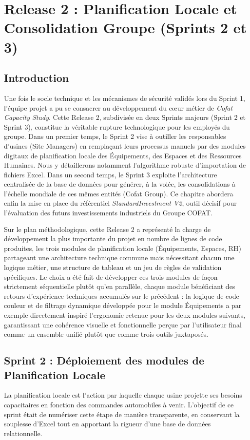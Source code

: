 \chapter{Release 2 : Planification Locale et Consolidation Groupe (Sprints 2 et 3)}
\label{chap:sprints_2_3}

\section{Introduction}
Une fois le socle technique et les mécanismes de sécurité validés lors du Sprint 1, l'équipe projet a pu se consacrer au développement du cœur métier de \textit{Cofat Capacity Study}. Cette Release 2, subdivisée en deux Sprints majeurs (Sprint 2 et Sprint 3), constitue la véritable rupture technologique pour les employés du groupe. Dans un premier temps, le Sprint 2 vise à outiller les responsables d'usines (Site Managers) en remplaçant leurs processus manuels par des modules digitaux de planification locale des Équipements, des Espaces et des Ressources Humaines. Nous y détaillerons notamment l'algorithme robuste d'importation de fichiers Excel. Dans un second temps, le Sprint 3 exploite l'architecture centralisée de la base de données pour générer, à la volée, les consolidations à l'échelle mondiale de ces mêmes entités (Cofat Group). Ce chapitre abordera enfin la mise en place du référentiel \textit{StandardInvestment V2}, outil décisif pour l'évaluation des futurs investissements industriels du Groupe COFAT.

Sur le plan méthodologique, cette Release 2 a représenté la charge de développement la plus importante du projet en nombre de lignes de code produites, les trois modules de planification locale (Équipements, Espaces, RH) partageant une architecture technique commune mais nécessitant chacun une logique métier, une structure de tableau et un jeu de règles de validation spécifiques. Le choix a été fait de développer ces trois modules de façon strictement séquentielle plutôt qu'en parallèle, chaque module bénéficiant des retours d'expérience techniques accumulés sur le précédent : la logique de code couleur et de filtrage dynamique développée pour le module Équipements a par exemple directement inspiré l'ergonomie retenue pour les deux modules suivants, garantissant une cohérence visuelle et fonctionnelle perçue par l'utilisateur final comme un ensemble unifié plutôt que comme trois outils juxtaposés.

\section{Sprint 2 : Déploiement des modules de Planification Locale}
La planification locale est l'action par laquelle chaque usine projette ses besoins capacitaires en fonction des commandes automobiles à venir. L'objectif de ce sprint était de numériser cette étape de manière transparente, en conservant la souplesse d'Excel tout en apportant la rigueur d'une base de données relationnelle.

